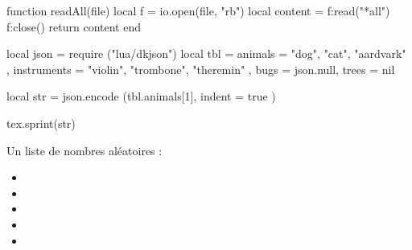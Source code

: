 \documentclass{article}
\begin{document}
\begin{luacode}
  function readAll(file)
    local f = io.open(file, "rb")
    local content = f:read("*all")
    f:close()
    return content
  end

 local json = require ("lua/dkjson")
 local tbl = {
    animals = { "dog", "cat", "aardvark" },
    instruments = { "violin", "trombone", "theremin" },
    bugs = json.null,
    trees = nil
  }

local str = json.encode (tbl.animals[1], { indent = true })

tex.sprint(str)
\end{luacode}

  Un liste de nombres aléatoires :
  \begin{itemize}
    \item {}
    \item {}
    \item {}
    \item {}
    \item {}
  \end{itemize}
\end{document}
